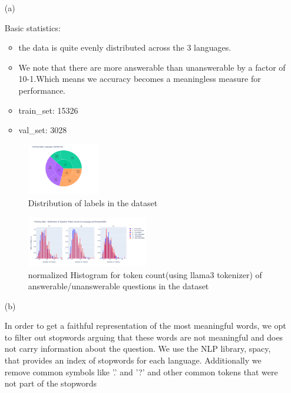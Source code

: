 \documentclass[11pt]{article}
\begin{document}
\begin{enumerate}
    \item[(a)] 

    Basic statistics:
    \begin{itemize}
        \item the data is quite evenly distributed across the 3 languages.
        \item We note that there are more answerable than unanswerable by a factor of 10-1.Which means we accuracy becomes a meaningless measure for performance.
        \item train\_set: 15326
        \item val\_set: 3028
    \end{itemize}

    \begin{figure}[ht]
        \centering
        \includegraphics[width=0.3\textwidth]{week1_a_dataset.png}
        \caption{Distribution of labels in the dataset}
        \label{fig:label_distribution}
    \end{figure}

    \begin{figure}[ht]
        \centering
        \includegraphics[width=0.5\textwidth]{week1_a_lang_token_distribution_normalized.png}
        \caption{normalized Histogram for token count(using llama3 tokenizer) of answerable/unanswerable questions in the dataset}
        \label{fig:language_distribution}
    \end{figure}

    \item[(b)] 

    In order to get a faithful representation of the most meaningful words, we opt to filter out stopwords arguing that these words are not meaningful and does not carry information about the question.
    We use the NLP library, spacy, that provides an index of stopwords for each language. Additionally we remove common symbols like '.' and '?' and other common tokens that were not part of the stopwords


\end{enumerate}
\end{document}
